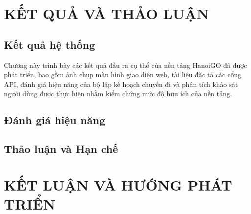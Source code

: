 \documentclass[a4paper,12pt]{report}
\begin{document}
\newpage
\setlength{\parindent}{15pt}
\setlength{\parskip}{0em}
\linespread{1}\selectfont

\chapter{KẾT QUẢ VÀ THẢO LUẬN}

\setlength{\parindent}{0pt}
\setlength{\parskip}{0.6em}
\linespread{1.3}\selectfont
\titlespacing*{\section}{0pt}{12pt}{4pt}

\section{Kết quả hệ thống}
Chương này trình bày các kết quả đầu ra cụ thể của nền tảng HanoiGO đã được phát triển, bao gồm ảnh chụp màn hình giao diện web, tài liệu đặc tả các cổng API, đánh giá hiệu năng của bộ lập kế hoạch chuyến đi và phân tích khảo sát người dùng được thực hiện nhằm kiểm chứng mức độ hữu ích của nền tảng.

\section{Đánh giá hiệu năng}

\section{Thảo luận và Hạn chế}

\newpage
\setlength{\parindent}{15pt}
\setlength{\parskip}{0em}
\linespread{1}\selectfont

\chapter{KẾT LUẬN VÀ HƯỚNG PHÁT TRIỂN}

\setlength{\parindent}{0pt}
\setlength{\parskip}{0.6em}
\linespread{1.3}\selectfont
\titlespacing*{\section}{0pt}{12pt}{4pt}
\end{document}
